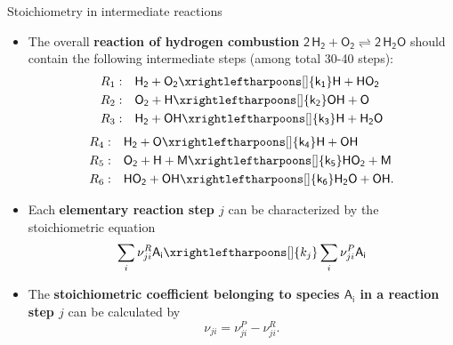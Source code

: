 \begin{frame}[shrink]{Stoichiometry in intermediate reactions}
	\begin{itemize}
		\item 
	The overall \alert{\bf reaction of hydrogen combustion} $\mathsf{2 \, H_2 + O_2 \rightleftharpoons 2\, H_2O}$ should contain the following intermediate steps (among total 30-40 steps):
	{\small
		\lcol
		\begin{alignat*}{2}
			R_1:  & \quad \mathsf{H_2 + O_2 \xrightleftharpoons[]{k_1} H + HO_2} \\
			R_2: & \quad \mathsf{O_2 + H \xrightleftharpoons[]{k_2} OH + O} \\
			R_3: & \quad \mathsf{H_2 + OH \xrightleftharpoons[]{k_3} H + H_2O} \\
		\end{alignat*}
	  \rcol
	  \begin{alignat*}{2}
	  	R_4: & \quad \mathsf{H_2 + O \xrightleftharpoons[]{k_4} H + OH} \\
	  	R_5: & \quad \mathsf{O_2 + H + M \xrightleftharpoons[]{k_5} HO_2 + M} \\
	  	R_6: & \quad \mathsf{HO_2 + OH \xrightleftharpoons[]{k_6} H_2O + OH}.
	  \end{alignat*}
	  \ecol
	}
	\pause
	\item Each {\bf elementary reaction step $j$} can be characterized by the stoichiometric equation
	\[
	\sum_{i} \nu^R_{ji}	\mathsf{A_i} \xrightleftharpoons[]{k_j} \sum_{i} \nu^P_{ji} \mathsf{A_i}
	\]
	\pause
	\item The \alert{\bf stoichiometric coefficient belonging to species $\mathsf{A_i}$ in a reaction step $j$} can be calculated by
	\[
	\nu_{ji} = \nu^P_{ji} - \nu^R_{ji}.
	\]
\end{itemize}
\end{frame}
%
%
